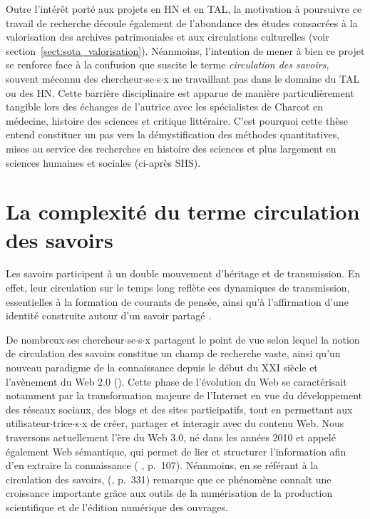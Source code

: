 Outre l'intérêt porté aux projets en \textsc{HN} et en \textsc{TAL}, la motivation à poursuivre ce travail de recherche découle également de l'abondance des études consacrées à la valorisation des archives patrimoniales et aux circulations culturelles (voir section~\ref{sect:sota_valorisation}). Néanmoins, l’intention de mener à bien ce projet se renforce face à la confusion que suscite le terme \textit{circulation des savoirs}, souvent méconnu des chercheur$\cdot$se$\cdot$s$\cdot$x ne travaillant pas dans le domaine du \textsc{TAL} ou des \textsc{HN}.
Cette barrière disciplinaire est apparue de manière particulièrement tangible lors des échanges de l’autrice avec les spécialistes de Charcot en médecine, histoire des sciences et critique littéraire. C'est pourquoi cette thèse entend constituer un pas vers la démystification des méthodes quantitatives, mises au service des recherches en histoire des sciences et plus largement en sciences humaines et sociales (ci-après \og{}\textsc{SHS}\fg{}).

\section{La complexité du terme \og{}circulation des savoirs\fg{}}

Les savoirs participent à un double mouvement d'héritage et de transmission. En effet, leur circulation sur le temps long reflète ces dynamiques de transmission, essentielles à la formation de courants de pensée, ainsi qu'à l'affirmation d’une identité construite autour d'un savoir partagé \citep[p.~251]{adell2011chapitre}. 

De nombreux$\cdot$ses chercheur$\cdot$se$\cdot$s$\cdot$x partagent le point de vue selon lequel la notion de circulation des savoirs constitue un champ de recherche vaste, ainsi qu'un nouveau paradigme de la connaissance depuis le début du XXI\ieme{} siècle et l'avènement du Web \textsc{2.0} (\citealp{landais2014frederic,quet2014frederic}). Cette phase de l'évolution du Web se caractérisait notamment par la transformation majeure de l'Internet en vue du développement des réseaux sociaux, des blogs et des sites participatifs, tout en permettant aux utilisateur$\cdot$trice$\cdot$s$\cdot$x de créer, partager et interagir avec du contenu Web. Nous traversons actuellement l'ère du Web \textsc{3.0}, né dans les années 2010 et appelé également \og{}Web sémantique\fg{}, qui permet de lier et structurer l'information afin d'en extraire la connaissance (\citeauthor{andrade2013sociologie} \citeyear{andrade2013sociologie}, p.~107). Néanmoins, en se référant à la circulation des savoirs, \citeauthor{landais2014frederic} (\citeyear{landais2014frederic}, p.~331) remarque que ce phénomène connaît une croissance importante grâce aux outils de la numérisation de la production scientifique et de l'édition numérique des ouvrages.

